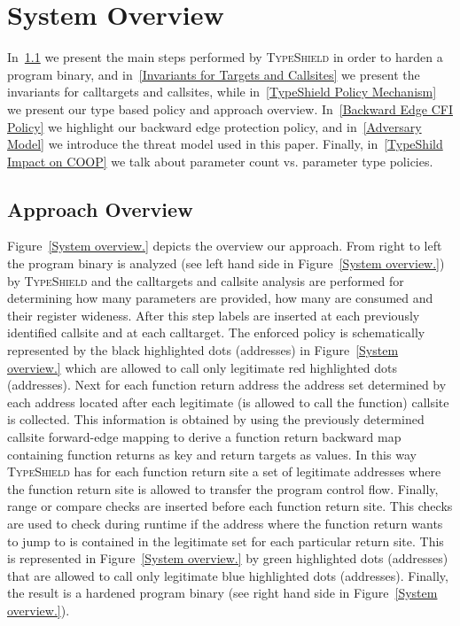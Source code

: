 \section{System Overview}
\label{chapter:TypeShild Overview}
In~\cref{Overview} we present the main steps performed by \textsc{TypeShield} in order to harden a program binary, and
in~\cref{Invariants for Targets and Callsites} we present the invariants for calltargets and callsites, while 
in~\cref{TypeShield Policy Mechanism} we present our type based policy and approach overview.
In~\cref{Backward Edge CFI Policy} we highlight our backward edge protection policy, and
in~\cref{Adversary Model} we introduce the threat model used in this paper.
Finally, in~\cref{TypeShild Impact on COOP} we talk about parameter count vs. parameter type policies.
\subsection{Approach Overview}
\label{Overview}
Figure~\ref{System overview.} depicts the overview our approach.
From right to left the program binary is analyzed (see left hand side in Figure~\ref{System overview.}) by \textsc{TypeShield} and the calltargets
and callsite analysis are performed for determining 
how many parameters are provided, 
how many are consumed and their register wideness.
After this step labels are inserted at each previously identified callsite and at each calltarget. 
The enforced policy is schematically represented by the black highlighted dots (addresses) in Figure~\ref{System overview.} which are allowed to call only legitimate red highlighted dots (addresses).
Next for each function return address the address set determined by each address located after each legitimate (is allowed to call the function) callsite is collected.
This information is obtained by using the previously determined callsite forward-edge mapping to derive a function return backward map containing function returns as key and return targets as values.
In this way \textsc{TypeShield} has for each function return site a set of legitimate addresses where the function return site is allowed to transfer the program control flow.
Finally, range or compare checks are inserted before each function return site. This checks are used to check during runtime if the 
address where the function return wants to jump to is contained in the legitimate set for each particular return site.
This is represented in Figure~\ref{System overview.} by green highlighted dots (addresses) that are allowed to call only legitimate blue highlighted dots (addresses).
Finally, the result is a hardened program binary (see right hand side in Figure~\ref{System overview.}).



